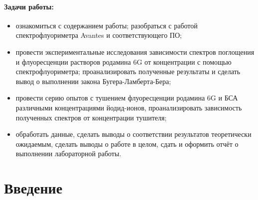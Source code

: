 \documentclass{article}
\begin{document}
\paragraph*{Задачи работы:}
    \begin{itemize}
        \item ознакомиться с содержанием работы; разобраться с работой спектрофлуориметра Avantes и соответствующего ПО;
        \item провести экспериментальные исследования зависимости спектров поглощения и флуоресценции растворов родамина 6G от концентрации с помощью спектрофлуориметра; проанализировать полученные результаты и сделать вывод о выполнении закона Бугера-Ламберта-Бера;
        \item провести серию опытов с тушением флуоресценции родамина 6G и БСА различными концентрациями йодид-ионов, проанализировать зависимость полученных спектров от концентрации тушителя;
        \item обработать данные, сделать выводы о соответствии результатов теоретически ожидаемым, сделать выводы о работе в целом, сдать и оформить отчёт о выполнении лабораторной работы.
    \end{itemize}
\section{Введение}
\end{document}

